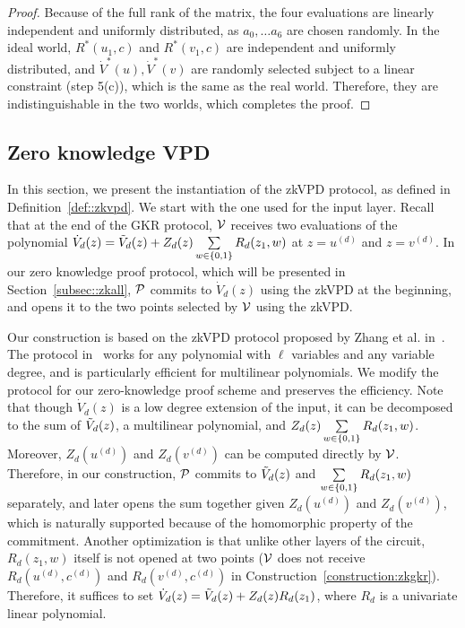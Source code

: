 \begin{proof}
Because of the full rank of the matrix, the four evaluations are linearly independent and uniformly distributed, as $a_0,\ldots a_6$ are chosen randomly. In the ideal world, $R^*(u_1,c)$ and $R^*(v_1,c)$ are independent and uniformly distributed, and $\dot{V}^*(u), \dot{V}^*(v)$ are randomly selected subject to a linear constraint (step 5(c)), which is the same as the real world. Therefore, they are indistinguishable in the two worlds, which completes the proof.   



\end{proof}

\subsection{Zero knowledge VPD}\label{subsec::our_zkvpd}
In this section, we present the instantiation of the zkVPD protocol, as defined in Definition~\ref{def::zkvpd}. We start with the one used for the input layer. Recall that at the end of the GKR protocol, $\V$ receives two evaluations of the polynomial $\dot{V}_d(z)=\tV_d(z)+Z_d(z)\sum\limits_{w \in\binary} R_d(z_1,w)$ at $z=u^{(d)}$ and $z=v^{(d)}$. In our zero knowledge proof protocol, which will be presented in Section~\ref{subsec::zkall}, $\P$ commits to $\dot{V}_d(z)$ using the zkVPD at the beginning, and opens it to the two points selected by $\V$ using the zkVPD.




Our construction is based on the zkVPD protocol proposed by Zhang et al. in~\cite{zkvpd}. The protocol in~\cite{zkvpd} works for any polynomial with $\ell$ variables and any variable degree, and is particularly efficient for multilinear polynomials. We modify the protocol for our zero-knowledge proof scheme and preserves the efficiency. Note that though $\dot{V}_d(z)$ is a low degree extension of the input, it can be decomposed to the sum of $\tV_d(z)$, a multilinear polynomial, and $Z_d(z)\sum\limits_{w \in\binary} R_d(z_1,w)$. Moreover, $Z_d(u^{(d)})$ and $Z_d(v^{(d)})$ can be computed directly by $\V$. Therefore, in our construction, $\P$ commits to $\tV_d(z)$ and $\sum\limits_{w \in\binary} R_d(z_1,w)$ separately, and later opens the sum together given $Z_d(u^{(d)})$ and $Z_d(v^{(d)})$, which is naturally supported because of the homomorphic property of the commitment. Another optimization is that unlike other layers of the circuit, $R_d(z_1,w)$ itself is not opened at two points ($\V$ does not receive $R_d(u^{(d)},c^{(d)})$ and $R_d(v^{(d)},c^{(d)})$ in Construction~\ref{construction:zkgkr}). Therefore, it suffices to set $\dot{V}_d(z)=\tV_d(z)+Z_d(z)R_d(z_1)$, where $R_d$ is a univariate linear polynomial.

